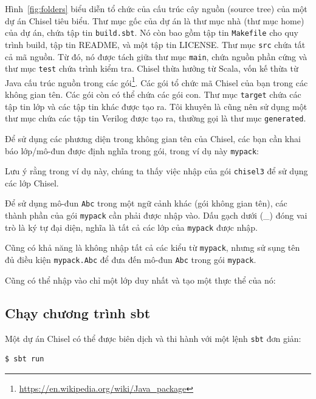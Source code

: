 \documentclass[%
    10pt,
    headinclude, footexclude,
    openright, %
    notitlepage,
    cleardoubleempty,
    headsepline,
    pointlessnumbers,
    bibtotoc, idxtotoc,
    ]{scrbook}
\newcommand{\code}[1]{{\small{\texttt{#1}}}}
\newcommand{\myref}[2]{\href{#1}{#2}}
\renewcommand{\myref}[2]{{#2}{\footnote{\url{#1}}}}
\begin{document}
Hình~\ref{fig:folders} biểu diễn tổ chức của cấu trúc cây nguồn (source tree) của một dự án Chisel tiêu biểu.
Thư mục gốc của dự án là thư mục nhà (thư mục home) của dự án, chứa tập tin \code{build.sbt}.
Nó còn bao gồm tập tin \code{Makefile} cho quy trình build, tập tin README, và một tập tin LICENSE.
Thư mục \code{src} chứa tất cả mã nguồn. Từ đó, nó được tách giữa thư mục \code{main},
chứa nguồn phần cứng và thư mục \code{test} chứa trình kiểm tra.
Chisel thừa hưởng từ Scala, vốn kế thừa từ Java cấu trúc nguồn
trong \myref{https://en.wikipedia.org/wiki/Java_package}{các gói}.
Các gói tổ chức mã Chisel của bạn trong các không gian tên. Các gói còn có thể chứa các gói con.
Thư mục \code{target} chứa các tập tin lớp và các tập tin khác được tạo ra.
Tôi khuyên là cũng nên sử dụng một thư mục chứa các tập tin Verilog được tạo ra, thường gọi là thư mục \code{generated}.

Để sử dụng các phương diện trong không gian tên của Chisel, các bạn cần khai báo lớp/mô-đun
được định nghĩa trong gói, trong ví dụ này \code{mypack}:


\noindent Lưu ý rằng trong ví dụ này, chúng ta thấy việc nhập của gói \code{chisel3} 
để sử dụng các lớp Chisel.

Để sử dụng mô-đun \code{Abc} trong một ngữ cảnh khác (gói không gian tên),
các thành phần của gói \code{mypack} cần phải được nhập vào. Dấu gạch dưới
(\_) đóng vai trò là ký tự đại diện, nghĩa là tất cả các lớp của \code{mypack} được nhập.


\noindent Cũng có khả năng là không nhập tất cả các kiểu từ \code{mypack},
nhưng sử sụng tên đủ điều kiện \code{mypack.Abc} để đưa đến mô-đun
\code{Abc} trong gói \code{mypack}.


\noindent Cũng có thể nhập vào chỉ một lớp duy nhất và tạo một thực thể của nó:


\subsection{Chạy chương trình sbt}

Một dự án Chisel có thể được biên dịch và thi hành với một lệnh \code{sbt} đơn giản:

\begin{verbatim}
$ sbt run
\end{verbatim}
\end{document}
